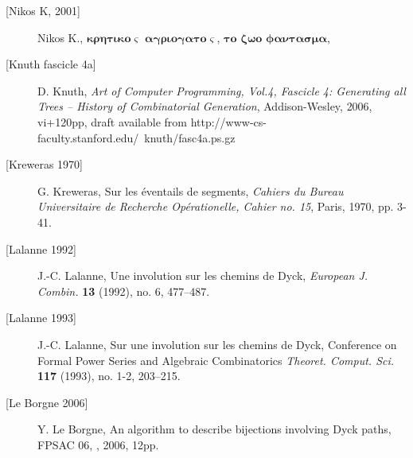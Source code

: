 \documentclass[11pt]{article} %
\begin{document}
\begin{description}
\item[{[Nikos K, 2001]}]
Nikos K., ${\mathbf \kappa}{\mathbf \rho}{\mathbf \eta}{\mathbf
\tau}{\mathbf \iota}{\mathbf \kappa}{\mathbf o}{\mathbf \varsigma}$
${\mathbf \alpha}{\mathbf \gamma}{\mathbf \rho}{\mathbf
\iota}{\mathbf o}{\mathbf \gamma}{\mathbf \alpha}{\mathbf \tau}{\mathbf o}{\mathbf \varsigma}$,
${\mathbf \tau}{\mathbf o}$ ${\mathbf \zeta}{\mathbf \omega}{\mathbf o}$
${\mathbf \phi}{\mathbf \alpha}{\mathbf \nu}{\mathbf \tau}{\mathbf \alpha}{\mathbf \sigma}{\mathbf \mu}{\mathbf \alpha}$,
\newline
{}


\item[{[Knuth fascicle 4a]}] D. Knuth, \emph{Art of Computer Programming, Vol.4, Fascicle 4: Generating all Trees -- History of Combinatorial Generation},
Addison-Wesley, 2006, vi+120pp, draft available from 
{http://www-cs-faculty.stanford.edu/~knuth/fasc4a.ps.gz}   

\item[{[Kreweras 1970]}] G. Kreweras, Sur les \'{e}ventails de segments,
\emph{Cahiers du Bureau Universitaire de Recherche Op\'{e}rationelle, Cahier no. 15},
Paris, 1970, pp. 3-41.

\item[{[Lalanne 1992]}] J.-C. Lalanne,  Une involution sur les chemins de 
Dyck, \emph{European J. Combin.} \textbf{13} (1992), no. 6, 477--487.

\item[{[Lalanne 1993]}] J.-C. Lalanne, Sur une involution sur les chemins de Dyck, Conference on Formal Power Series and Algebraic 
Combinatorics \emph{Theoret. Comput. Sci.} \textbf{117} (1993), no. 1-2, 203--215. 

\item[{[Le Borgne 2006]}]
Y. Le Borgne, An algorithm to describe bijections involving Dyck
paths, FPSAC 06,
,
2006, 12pp.


\end{description}
\end{document}
